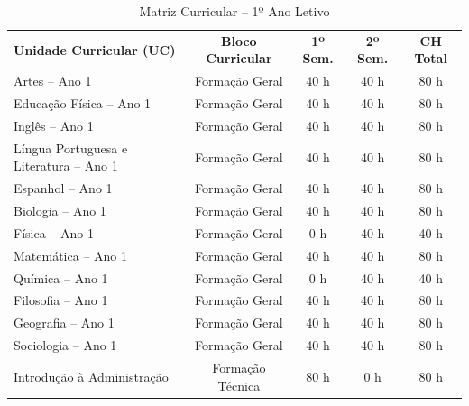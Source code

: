 

\begin{table}[H]
\centering
\small
\caption{Matriz Curricular -- 1º Ano Letivo}
\label{qua:matriz-ano1}
\vspace{0.2cm}
\begin{tabularx}{\linewidth}{|X|c|c|c|c|}
\hline
\rowcolor{ifscgreen!20}
\multicolumn{5}{|c|}{\textbf{\large 1º ANO LETIVO (SEMESTRES 1 E 2)}} \\ \hline
\rowcolor{cinzaTabela}
\textbf{Unidade Curricular (UC)} & \textbf{Bloco Curricular} & \textbf{1º Sem.} & \textbf{2º Sem.} & \textbf{CH Total} \\ \hline
Artes -- Ano 1 & Formação Geral & 40 h & 40 h & 80 h \\ \hline
Educação Física -- Ano 1 & Formação Geral & 40 h & 40 h & 80 h \\ \hline
Inglês -- Ano 1 & Formação Geral & 40 h & 40 h & 80 h \\ \hline
Língua Portuguesa e Literatura -- Ano 1 & Formação Geral & 40 h & 40 h & 80 h \\ \hline
Espanhol -- Ano 1\revisaocepe{*} & Formação Geral & 40 h & 40 h & 80 h \\ \hline
Biologia -- Ano 1 & Formação Geral & 40 h & 40 h & 80 h \\ \hline
Física -- Ano 1 & Formação Geral & 0 h & 40 h & 40 h \\ \hline
Matemática -- Ano 1 & Formação Geral & 40 h & 40 h & 80 h \\ \hline
Química -- Ano 1 & Formação Geral & 0 h & 40 h & 40 h \\ \hline
Filosofia -- Ano 1 & Formação Geral & 40 h & 40 h & 80 h \\ \hline
Geografia -- Ano 1 & Formação Geral & 40 h & 40 h & 80 h \\ \hline
Sociologia -- Ano 1 & Formação Geral & 40 h & 40 h & 80 h \\ \hline
Introdução à Administração & Formação Técnica & 80 h & 0 h & 80 h \\ \hline

\end{tabularx}
\end{table}
